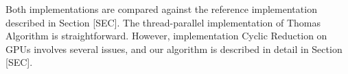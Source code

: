 \documentclass{article}
\begin{document}
    Both implementations are compared against the reference implementation
    described in Section [SEC].
    The thread-parallel implementation of Thomas Algorithm is
    straightforward.
    However, implementation Cyclic Reduction on GPUs involves several issues,
    and our algorithm is described in detail in Section [SEC].
\end{document}
